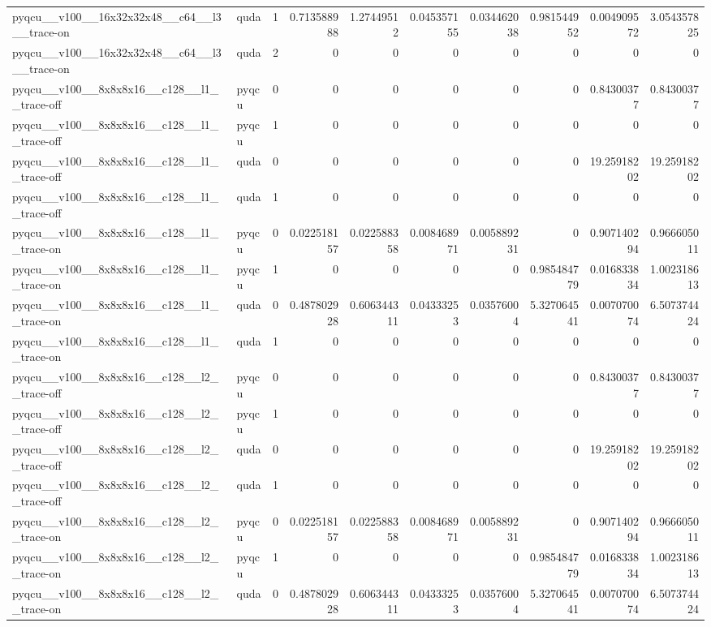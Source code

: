 \begin{table}[htbp]
\begin{tabular}{@{}llrrrrrrrr@{}}
pyqcu\_\_v100\_\_16x32x32x48\_\_c64\_\_l3\_\_trace-on & quda & 1 & 0.713588988 & 1.27449512 & 0.045357155 & 0.034462038 & 0.981544952 & 0.004909572 & 3.054357825 \\
pyqcu\_\_v100\_\_16x32x32x48\_\_c64\_\_l3\_\_trace-on & quda & 2 & 0 & 0 & 0 & 0 & 0 & 0 & 0 \\
pyqcu\_\_v100\_\_8x8x8x16\_\_c128\_\_l1\_\_trace-off & pyqcu & 0 & 0 & 0 & 0 & 0 & 0 & 0.84300377 & 0.84300377 \\
pyqcu\_\_v100\_\_8x8x8x16\_\_c128\_\_l1\_\_trace-off & pyqcu & 1 & 0 & 0 & 0 & 0 & 0 & 0 & 0 \\
pyqcu\_\_v100\_\_8x8x8x16\_\_c128\_\_l1\_\_trace-off & quda & 0 & 0 & 0 & 0 & 0 & 0 & 19.25918202 & 19.25918202 \\
pyqcu\_\_v100\_\_8x8x8x16\_\_c128\_\_l1\_\_trace-off & quda & 1 & 0 & 0 & 0 & 0 & 0 & 0 & 0 \\
pyqcu\_\_v100\_\_8x8x8x16\_\_c128\_\_l1\_\_trace-on & pyqcu & 0 & 0.022518157 & 0.022588358 & 0.008468971 & 0.005889231 & 0 & 0.907140294 & 0.966605011 \\
pyqcu\_\_v100\_\_8x8x8x16\_\_c128\_\_l1\_\_trace-on & pyqcu & 1 & 0 & 0 & 0 & 0 & 0.985484779 & 0.016833834 & 1.002318613 \\
pyqcu\_\_v100\_\_8x8x8x16\_\_c128\_\_l1\_\_trace-on & quda & 0 & 0.487802928 & 0.606344311 & 0.04333253 & 0.03576004 & 5.327064541 & 0.007070074 & 6.507374424 \\
pyqcu\_\_v100\_\_8x8x8x16\_\_c128\_\_l1\_\_trace-on & quda & 1 & 0 & 0 & 0 & 0 & 0 & 0 & 0 \\
pyqcu\_\_v100\_\_8x8x8x16\_\_c128\_\_l2\_\_trace-off & pyqcu & 0 & 0 & 0 & 0 & 0 & 0 & 0.84300377 & 0.84300377 \\
pyqcu\_\_v100\_\_8x8x8x16\_\_c128\_\_l2\_\_trace-off & pyqcu & 1 & 0 & 0 & 0 & 0 & 0 & 0 & 0 \\
pyqcu\_\_v100\_\_8x8x8x16\_\_c128\_\_l2\_\_trace-off & quda & 0 & 0 & 0 & 0 & 0 & 0 & 19.25918202 & 19.25918202 \\
pyqcu\_\_v100\_\_8x8x8x16\_\_c128\_\_l2\_\_trace-off & quda & 1 & 0 & 0 & 0 & 0 & 0 & 0 & 0 \\
pyqcu\_\_v100\_\_8x8x8x16\_\_c128\_\_l2\_\_trace-on & pyqcu & 0 & 0.022518157 & 0.022588358 & 0.008468971 & 0.005889231 & 0 & 0.907140294 & 0.966605011 \\
pyqcu\_\_v100\_\_8x8x8x16\_\_c128\_\_l2\_\_trace-on & pyqcu & 1 & 0 & 0 & 0 & 0 & 0.985484779 & 0.016833834 & 1.002318613 \\
pyqcu\_\_v100\_\_8x8x8x16\_\_c128\_\_l2\_\_trace-on & quda & 0 & 0.487802928 & 0.606344311 & 0.04333253 & 0.03576004 & 5.327064541 & 0.007070074 & 6.507374424 \\

\end{tabular}
\end{table}
